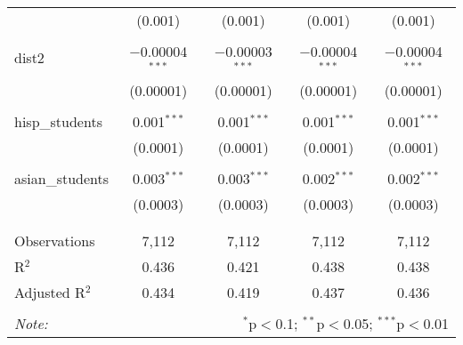 \begin{table}[!htbp]
\begin{tabular}{@{\extracolsep{-2pt}}lcccc}
  & (0.001) & (0.001) & (0.001) & (0.001) \\ 
  & & & & \\ 
 dist2 & $-$0.00004$^{***}$ & $-$0.00003$^{***}$ & $-$0.00004$^{***}$ & $-$0.00004$^{***}$ \\ 
  & (0.00001) & (0.00001) & (0.00001) & (0.00001) \\ 
  & & & & \\ 
 hisp\_students & 0.001$^{***}$ & 0.001$^{***}$ & 0.001$^{***}$ & 0.001$^{***}$ \\ 
  & (0.0001) & (0.0001) & (0.0001) & (0.0001) \\ 
  & & & & \\ 
 asian\_students & 0.003$^{***}$ & 0.003$^{***}$ & 0.002$^{***}$ & 0.002$^{***}$ \\ 
  & (0.0003) & (0.0003) & (0.0003) & (0.0003) \\ 
  & & & & \\ 
\hline \\[-1.8ex] 
Observations & 7,112 & 7,112 & 7,112 & 7,112 \\ 
R$^{2}$ & 0.436 & 0.421 & 0.438 & 0.438 \\ 
Adjusted R$^{2}$ & 0.434 & 0.419 & 0.437 & 0.436 \\ 
\hline 
\hline \\[-1.8ex] 
\textit{Note:}  & \multicolumn{4}{r}{$^{*}$p$<$0.1; $^{**}$p$<$0.05; $^{***}$p$<$0.01} \\ 
\end{tabular} 
\end{table} 
